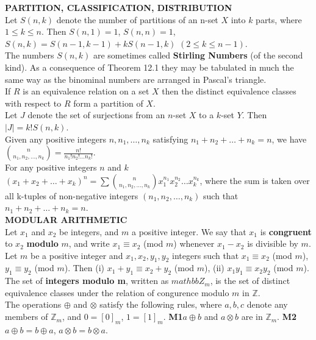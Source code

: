 \documentclass[10pt,landscape]{article}
\begin{document}
\begin{multicols}{4}
\textbf{PARTITION, CLASSIFICATION, DISTRIBUTION}\\
Let $S(n,k)$ denote the number of partitions of an n-set $X$ into $k$
parts, where $1 \leq k \leq n$. Then $S(n,1) = 1$, $S(n,n) = 1$,
$S(n,k) = S(n-1, k-1) + kS(n-1,k)$ $(2 \leq k \leq n-1)$.\\
The numbers $S(n,k)$ are sometimes called \textbf{Stirling Numbers}
(of the second kind). As a consequence of Theorem 12.1 they may be
tabulated in much the same way as the binominal numbers are arranged
in Pascal's triangle.\\
If $R$ is an equivalence relation on a set $X$ then the distinct
equivalence classes with respect to $R$ form a partition of $X$.\\
Let $J$ denote the set of surjections from an $n$-set $X$ to a $k$-set
$Y$. Then $|J| = k!S(n,k)$.\\
Given any positive integers $n, n_{1}, \dots ,n_{k}$ satisfying
$n_{1} + n_{2} + \dots + n_{k} = n$, we have
$\binom{n}{n_{1},n_{2},\dots,n_{k}}=\frac{n!}{n_{1}!n_{2}!\dots
  n_{k}!}$.\\
For any positive integers $n$ and $k$ $(x_{1}+ x_{2} + \dots
+ x_{k})^{n} = \sum \binom{n}{n_{1},n_{2}, \dots
  ,n_{k}} x_{1}^{n_{1}} x_{2}^{n_{2}} \dots x_{k}^{n_{k}}$, where the sum
    is taken over all k-tuples of non-negative integers $(n_{1},
    n_{2}, \dots, n_{k})$ such that $n_{1}+n_{2}+ \dots + n_{k} = n$.\\   
\textbf{MODULAR ARITHMETIC}\\
Let $x_{1}$ and $x_{2}$ be integers, and $m$ a positive integer. We
say that $x_{1}$ is \textbf{congruent} to $x_{2}$ \textbf{modulo} $m$,
and write $x_{1} \equiv x_{2}$ (mod $m$) whenever $x_{1} - x_{2}$ is
divisible by $m$.\\
Let $m$ be a positive integer and $x_{1}, x_{2}, y_{1}, y_{2}$
integers such that $x_{1} \equiv x_{2}$ (mod $m$), $y_{1} \equiv y_{2}$
(mod $m$). Then (i) $x_{1} + y_{1} \equiv x_{2} + y_{2}$ (mod $m$), (ii)
$x_{1}y_{1} \equiv x_{2}y_{2}$ (mod $m$).\\
The set of \textbf{integers modulo m}, written as $mathbb{Z}_{m}$, is
the set of distinct equivalence classes under the relation of
congurence modulo $m$ in $\mathbb{Z}$.\\
The operations $\oplus$ and $\otimes$ satisfy the following rules,
where $a,b,c$ denote any members of $\mathbb{Z}_{m}$, and $0
= [0]_{m}$, $1 = [1]_{m}$.
\textbf{M1}$a \oplus b$ and $a \otimes b$ are in $\mathbb{Z}_{m}$.
\textbf{M2}$a \oplus b = b \oplus a$, $a \otimes b = b \otimes a$.

\end{multicols}
\end{document}
